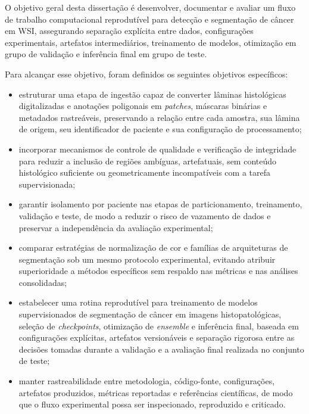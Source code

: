 O objetivo geral desta dissertação é desenvolver, documentar e avaliar um fluxo
de trabalho computacional reprodutível para detecção e segmentação de câncer em WSI, assegurando separação explícita entre
dados, configurações experimentais, artefatos intermediários, treinamento de
modelos, otimização em grupo de validação e inferência final em grupo de teste.

Para alcançar esse objetivo, foram definidos os seguintes objetivos específicos:

\begin{itemize}
    \item estruturar uma etapa de ingestão capaz de converter lâminas
    histológicas digitalizadas e anotações poligonais em \textit{patches},
    máscaras binárias e metadados rastreáveis, preservando a relação entre cada
    amostra, sua lâmina de origem, seu identificador de paciente e sua
    configuração de processamento;

    \item incorporar mecanismos de controle de qualidade e verificação de
    integridade para reduzir a inclusão de regiões ambíguas, artefatuais, sem
    conteúdo histológico suficiente ou geometricamente incompatíveis com a
    tarefa supervisionada;

    \item garantir isolamento por paciente nas etapas de particionamento,
    treinamento, validação e teste, de modo a reduzir o risco de vazamento de
    dados e preservar a independência da avaliação experimental;

    \item comparar estratégias de normalização de cor e famílias de arquiteturas
    de segmentação sob um mesmo protocolo experimental, evitando atribuir
    superioridade a métodos específicos sem respaldo nas métricas e nas análises consolidadas;

    \item estabelecer uma rotina reprodutível para treinamento de modelos
    supervisionados de segmentação de câncer em imagens histopatológicas,
    seleção de \textit{checkpoints}, otimização de \textit{ensemble} e inferência
    final, baseada em configurações explícitas, artefatos versionáveis e
    separação rigorosa entre as decisões tomadas durante a validação e a
    avaliação final realizada no conjunto de teste;

    \item manter rastreabilidade entre metodologia, código-fonte, configurações,
    artefatos produzidos, métricas reportadas e referências científicas, de modo
    que o fluxo experimental possa ser inspecionado, reproduzido e criticado.
\end{itemize}

